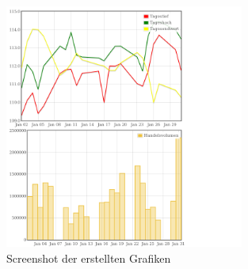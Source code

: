 \begin{figure}[htbp]
  \centering
     \includegraphics[width=0.7\textwidth]{src/screenshot.png}
  \caption{Screenshot der erstellten Grafiken}
\end{figure}

\printbibliography %


